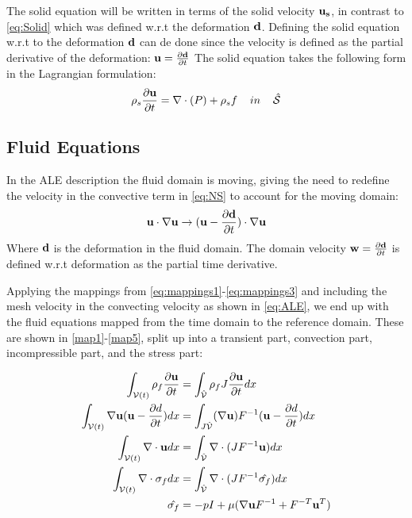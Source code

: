 The solid equation will be written in terms of the solid velocity $\bold{u_s}$, in contrast to \ref{eq:Solid} which was defined w.r.t the deformation $\bold{d}$. Defining the solid equation w.r.t to the deformation $\bold{d}$ can de done since the velocity is defined as the partial derivative of the deformation: $\bold{u} = \frac{\partial \bold{d}}{\partial t}$
The solid equation takes the following form in the Lagrangian formulation:
\begin{equation} \label{eq:solid}
\rho_s \frac{\partial \bold{u}}{\partial t} = \nabla \cdot (P) + \rho_s f \hspace{4mm}in\hspace{4mm} \hat{\mathcal{S}} 
\end{equation}

\subsection{Fluid Equations}
In the ALE description the fluid domain is moving, giving the need to redefine the velocity in the convective term in \eqref{eq:NS} to account for the moving domain: 
\begin{equation}
\bold{u} \cdot \nabla \bold{u} \rightarrow (\bold{u}-\frac{\partial \bold{d}}{\partial t}) \cdot \nabla \bold{u}  
\end{equation}
Where $\bold{d}$ is the deformation in the fluid domain. The domain velocity $\bold{w} = \frac{\partial \bold{d}}{\partial t}$ is defined w.r.t deformation as the partial time derivative.

Applying the mappings from \eqref{eq:mappings1}-\eqref{eq:mappings3} and including the mesh velocity in the convecting velocity as shown in \eqref{eq:ALE}, we end up with the fluid equations mapped from the time domain to the reference domain. These are shown in \ref{map1}-\ref{map5}, split up into a transient part, convection part, incompressible part, and the stress part:

\begin{align}
\int_{\mathcal{V}(t)} \rho_f \frac{\partial \bold{u}}{\partial t}  & = \int_{\hat{\mathcal{V}}}  \rho_f J \frac{\partial \bold{u}}{\partial t} dx \label{map1} \\
\int_{\mathcal{V}(t)} \nabla \bold{u} (\bold{u}-\frac{\partial d}{\partial t}) dx  &= \int_{J \hat{\mathcal{V}}} (\nabla \bold{u})F^{-1}(\bold{u}-\frac{\partial d}{\partial t}) dx  \label{map2}\\
\int_{\mathcal{V}(t)} \nabla \cdot \bold{u} dx  &=\int_{\hat{\mathcal{V}}}  \nabla \cdot (J F^{-1} \bold{u}  ) dx \label{map3} \\
\int_{\mathcal{V}(t)} \nabla \cdot \sigma_f dx &= \int_{\hat{\mathcal{V}}} \nabla \cdot( J F^{-1} \hat{\sigma_f} )     dx \label{map4} \\
\hat{\sigma_f} &= -pI + \mu ( \nabla \bold{u} F^{-1} + F^{-T} \bold{u}^{T}  ) \label{map5}
\end{align}

